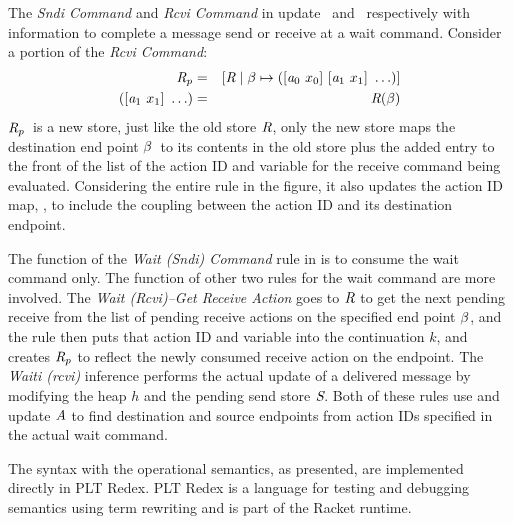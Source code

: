 The \emph{Sndi Command} and \emph{Rcvi Command} in
 update \eprcv\ and \epsnd\ respectively with
information to complete a message send or receive at a wait command.
Consider a portion of the \emph{Rcvi Command}:  
\begin{eqnarray*}
\textit{R}_p &=& [\textit{R} \mid \beta \mapsto
  ([\mathit{a}_0\ x_0]\ [\mathit{a}_1\ x_1]\ \ldots)]\\
([\mathit{a}_1\ x_1]\ \ldots) &=& \textit{R}(\beta)
\end{eqnarray*}
$\textit{R}_p$\ is a new store, just
like the old store $\textit{R}$, only the new store maps the destination
end point $\beta$\ to its contents in the old store plus the added
entry to the front of the list of the action ID and variable for the
receive command being evaluated. Considering the entire rule in the figure, it also updates the
action ID map, \aidmap, to include the coupling between the action ID
and its destination endpoint.

The function of the \emph{Wait (Sndi) Command} rule in  is to consume the wait command
only.  The function of other two rules for the wait command are more involved.
The \emph{Wait (Rcvi)--Get Receive Action} goes to $\textit{R}$ to get the
next pending receive from the list of pending receive actions on the
specified end point $\beta$, and the rule then puts that action ID and
variable into the continuation $k$, and creates $\textit{R}_p$ to reflect
the newly consumed receive action on the endpoint.  The \emph{Waiti
(rcvi)} inference performs the actual update of a delivered message by
modifying the heap $h$ and the pending send store $\textit{S}$.  Both of
these rules use and update $\textit{A}$ to find destination and
source endpoints from action IDs specified in the actual wait command.

The syntax with the operational semantics, as presented, are
implemented directly in PLT Redex.  PLT Redex is a language for
testing and debugging semantics using term rewriting and is part of the
Racket runtime.

